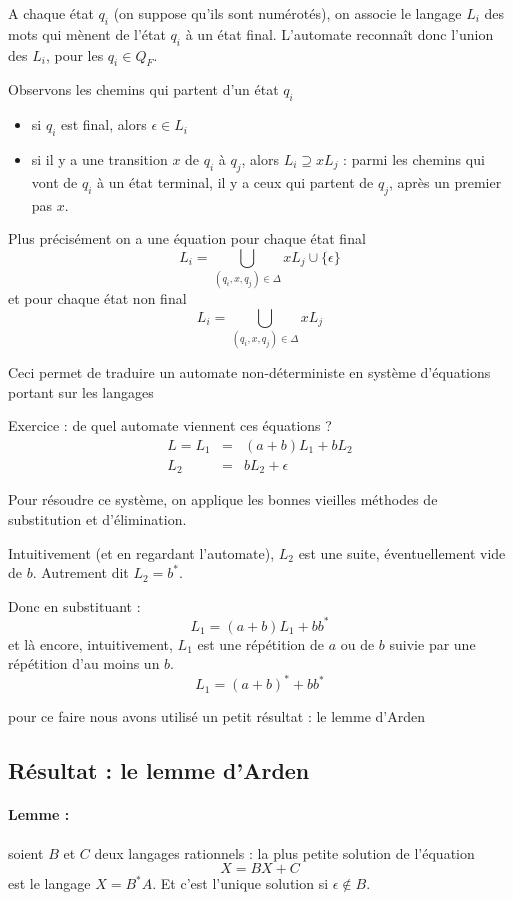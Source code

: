 \documentclass[10pt,twoside]{article}
\begin{document}
A chaque état $q_i$ (on suppose qu'ils sont numérotés), on associe le
langage $L_i$ des mots qui mènent de l'état $q_i$ à un état final.
L'automate reconnaît donc l'union des $L_i$, pour les $q_i \in Q_F$.

Observons les chemins qui partent d'un état $q_i$
\begin{itemize}
\item si $q_i$ est final, alors  $\epsilon \in L_i$
\item si il y a une transition $x$ de $q_i$ à $q_j$, alors
$L_i \supseteq x L_j$ : parmi les chemins qui vont de $q_i$ à un état 
terminal, il y a ceux qui partent de $q_j$, après un premier pas $x$.
\end{itemize}

Plus précisément on a une équation pour chaque état final
$$ L_i = \bigcup_{(q_i,x,q_j) \in \Delta} x L_j  \cup \{\epsilon\}$$
et pour chaque état non final 
$$ L_i = \bigcup_{(q_i,x,q_j) \in \Delta} x L_j $$

Ceci permet de traduire un automate non-déterministe 
en système d'équations portant sur les langages

Exercice : de quel automate viennent ces équations ?
\begin{eqnarray*}
L = L_1 &=& (a + b) L_1 + b L_2 \\
L_2 &=& b L_2 + \epsilon
\end{eqnarray*}
 
Pour résoudre ce système, on applique les bonnes vieilles méthodes
de substitution et d'élimination.

Intuitivement (et en regardant l'automate), $L_2$ est une suite, 
éventuellement vide de $b$. Autrement dit $L_2 = b^*$.

Donc en substituant :
$$ L_1 = (a + b) L_1 + b b^* $$
et là encore, intuitivement, $L_1$ est une répétition de $a$ ou de $b$
suivie par une répétition d'au moins un $b$.
$$ L_1 = (a + b)^* + b b^* $$

pour ce faire nous avons utilisé un petit résultat : le lemme d'Arden

\subsection{Résultat : le lemme d'Arden}

\paragraph{Lemme :} soient $B$ et $C$ deux langages rationnels : 
la plus petite solution de l'équation 
$$ X = BX + C $$
est le langage $X = B^* A$. Et c'est l'unique solution si
$\epsilon \not\in B$.
\end{document}
